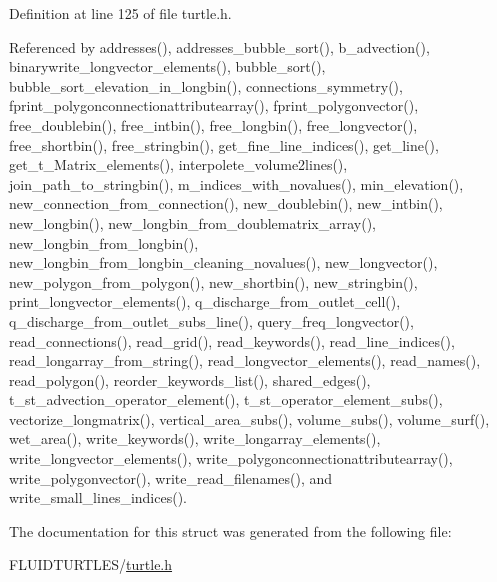 Definition at line 125 of file turtle.\-h.



Referenced by addresses(), addresses\-\_\-bubble\-\_\-sort(), b\-\_\-advection(), binarywrite\-\_\-longvector\-\_\-elements(), bubble\-\_\-sort(), bubble\-\_\-sort\-\_\-elevation\-\_\-in\-\_\-longbin(), connections\-\_\-symmetry(), fprint\-\_\-polygonconnectionattributearray(), fprint\-\_\-polygonvector(), free\-\_\-doublebin(), free\-\_\-intbin(), free\-\_\-longbin(), free\-\_\-longvector(), free\-\_\-shortbin(), free\-\_\-stringbin(), get\-\_\-fine\-\_\-line\-\_\-indices(), get\-\_\-line(), get\-\_\-t\-\_\-\-Matrix\-\_\-elements(), interpolete\-\_\-volume2lines(), join\-\_\-path\-\_\-to\-\_\-stringbin(), m\-\_\-indices\-\_\-with\-\_\-novalues(), min\-\_\-elevation(), new\-\_\-connection\-\_\-from\-\_\-connection(), new\-\_\-doublebin(), new\-\_\-intbin(), new\-\_\-longbin(), new\-\_\-longbin\-\_\-from\-\_\-doublematrix\-\_\-array(), new\-\_\-longbin\-\_\-from\-\_\-longbin(), new\-\_\-longbin\-\_\-from\-\_\-longbin\-\_\-cleaning\-\_\-novalues(), new\-\_\-longvector(), new\-\_\-polygon\-\_\-from\-\_\-polygon(), new\-\_\-shortbin(), new\-\_\-stringbin(), print\-\_\-longvector\-\_\-elements(), q\-\_\-discharge\-\_\-from\-\_\-outlet\-\_\-cell(), q\-\_\-discharge\-\_\-from\-\_\-outlet\-\_\-subs\-\_\-line(), query\-\_\-freq\-\_\-longvector(), read\-\_\-connections(), read\-\_\-grid(), read\-\_\-keywords(), read\-\_\-line\-\_\-indices(), read\-\_\-longarray\-\_\-from\-\_\-string(), read\-\_\-longvector\-\_\-elements(), read\-\_\-names(), read\-\_\-polygon(), reorder\-\_\-keywords\-\_\-list(), shared\-\_\-edges(), t\-\_\-st\-\_\-advection\-\_\-operator\-\_\-element(), t\-\_\-st\-\_\-operator\-\_\-element\-\_\-subs(), vectorize\-\_\-longmatrix(), vertical\-\_\-area\-\_\-subs(), volume\-\_\-subs(), volume\-\_\-surf(), wet\-\_\-area(), write\-\_\-keywords(), write\-\_\-longarray\-\_\-elements(), write\-\_\-longvector\-\_\-elements(), write\-\_\-polygonconnectionattributearray(), write\-\_\-polygonvector(), write\-\_\-read\-\_\-filenames(), and write\-\_\-small\-\_\-lines\-\_\-indices().



The documentation for this struct was generated from the following file\-:\begin{DoxyCompactItemize}
\item 
F\-L\-U\-I\-D\-T\-U\-R\-T\-L\-E\-S/\hyperlink{turtle_8h}{turtle.\-h}\end{DoxyCompactItemize}
